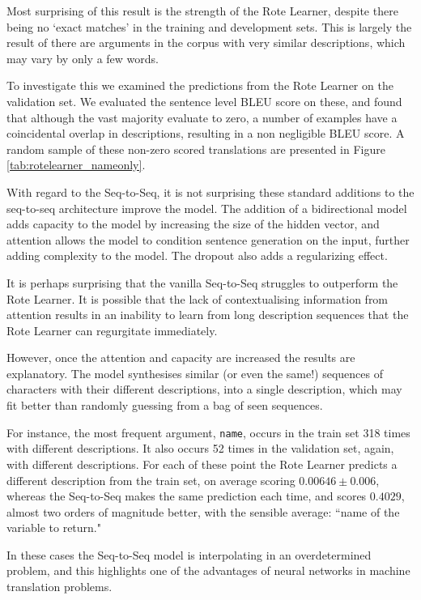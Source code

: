 Most surprising of this result is the strength of the Rote Learner, despite there being no `exact matches' in the training and development sets. 
This is largely the result of there are arguments in the corpus with very similar descriptions, which may vary by only a few words. 

To investigate this we examined the predictions from the Rote Learner on the validation set. 
We evaluated the sentence level BLEU score on these, and found that although the vast majority evaluate to zero, a number of examples have a coincidental overlap in descriptions, resulting in a non negligible BLEU score. 
A random sample of these non-zero scored translations are presented in Figure \ref{tab:rotelearner_nameonly}.

With regard to the Seq-to-Seq, it is not surprising these standard additions to the seq-to-seq architecture improve the model. 
The addition of a bidirectional model adds capacity to the model by increasing the size of the hidden vector, and attention allows the model to condition sentence generation on the input, further adding complexity to the model.
The dropout also adds a regularizing effect.

It is perhaps surprising that the vanilla Seq-to-Seq struggles to outperform the Rote Learner. 
It is possible that the lack of contextualising information from attention results in an inability to learn from long description sequences that the Rote Learner can regurgitate immediately. 

However, once the attention and capacity are increased the results are explanatory.
The model synthesises similar (or even the same!) sequences of characters with their different descriptions, into a single description, which may fit better than randomly guessing from a bag of seen sequences. 

For instance, the most frequent argument, \texttt{name}, occurs in the train set 318 times with different descriptions. 
It also occurs 52 times in the validation set, again, with different descriptions. 
For each of these point the Rote Learner predicts a different description from the train set, on average scoring $0.00646 \pm 0.006$, whereas the Seq-to-Seq makes the same prediction each time, and scores $0.4029$, almost two orders of magnitude better, with the sensible average: ``name of the variable to return." 

In these cases the Seq-to-Seq model is interpolating in an overdetermined problem, and this highlights one of the advantages of neural networks in machine translation problems. 




